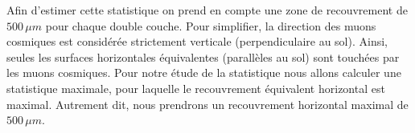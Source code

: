  \medskip

 Afin d'estimer cette statistique on prend en compte une zone de recouvrement de $500 \, \mu m$ pour chaque double couche. Pour simplifier, la direction des muons cosmiques est consid\'er\'ee strictement verticale (perpendiculaire au sol). Ainsi, seules les surfaces horizontales \'equivalentes (parall\`eles au sol) sont touch\'ees par les muons cosmiques. Pour notre \'etude de la statistique nous allons calculer une statistique maximale, pour laquelle le recouvrement équivalent horizontal est maximal. Autrement dit, nous prendrons un recouvrement horizontal maximal de $500 \, \mu m$.
 
 
  
% 
% 
 
 \medskip
 
 
